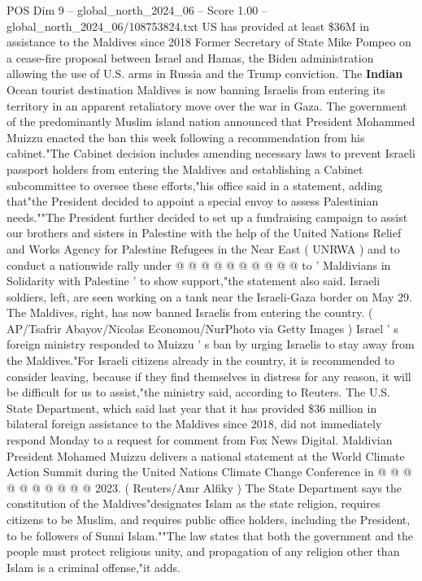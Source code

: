 \begin{textsample}{POS Dim 9 – global\_north\_2024\_06 – Score 1.00 – global\_north\_2024\_06/108753824.txt}  \label{ex:f9_pos_280}
US has provided at least \$36M in assistance to the Maldives since 2018 Former Secretary of State Mike Pompeo on a cease-fire proposal between Israel and Hamas, the Biden administration allowing the use of U.S. arms in Russia and the Trump conviction.
The \textbf{Indian} Ocean tourist destination Maldives is now banning Israelis from entering its territory in an apparent retaliatory move over the war in Gaza.
The government of the predominantly Muslim island nation announced that President Mohammed Muizzu enacted the ban this week following a recommendation from his cabinet."The Cabinet decision includes amending necessary laws to prevent Israeli passport holders from entering the Maldives and establishing a Cabinet subcommittee to oversee these efforts,"his office said in a statement, adding that"the President decided to appoint a special envoy to assess Palestinian needs.""The President further decided to set up a fundraising campaign to assist our brothers and sisters in Palestine with the help of the United Nations Relief and Works Agency for Palestine Refugees in the Near East ( UNRWA ) and to conduct a nationwide rally under @ @ @ @ @ @ @ @ @ @ to ' Maldivians in Solidarity with Palestine ' to show support,"the statement also said.
Israeli soldiers, left, are seen working on a tank near the Israeli-Gaza border on May 29.
The Maldives, right, has now banned Israelis from entering the country. ( AP/Tsafrir Abayov/Nicolas Economou/NurPhoto via Getty Images ) Israel ' s foreign ministry responded to Muizzu ' s ban by urging Israelis to stay away from the Maldives."For Israeli citizens already in the country, it is recommended to consider leaving, because if they find themselves in distress for any reason, it will be difficult for us to assist,"the ministry said, according to Reuters.
The U.S.
State Department, which said last year that it has provided \$36 million in bilateral foreign assistance to the Maldives since 2018, did not immediately respond Monday to a request for comment from Fox News Digital.
Maldivian President Mohamed Muizzu delivers a national statement at the World Climate Action Summit during the United Nations Climate Change Conference in @ @ @ @ @ @ @ @ @ @ 2023. ( Reuters/Amr Alfiky ) The State Department says the constitution of the Maldives"designates Islam as the state religion, requires citizens to be Muslim, and requires public office holders, including the President, to be followers of Sunni Islam.""The law states that both the government and the people must protect religious unity, and propagation of any religion other than Islam is a criminal offense,"it adds.

\end{textsample}
